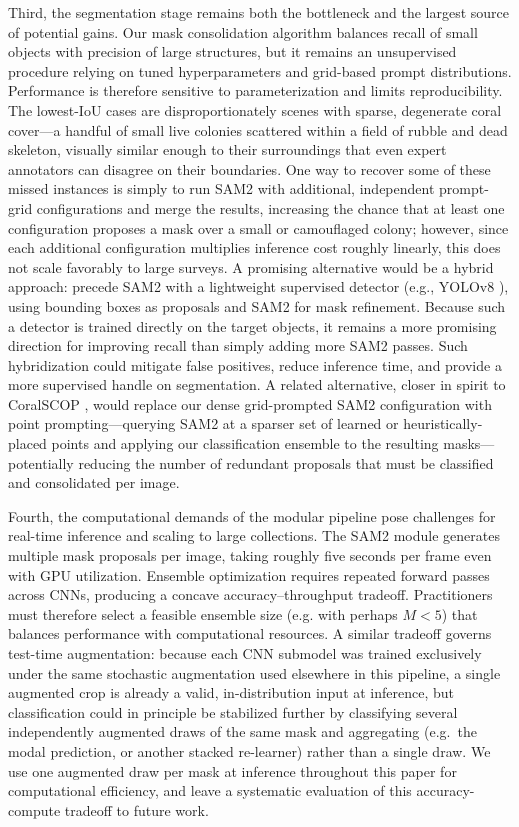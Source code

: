 \documentclass[11pt]{elsarticle}
\begin{document}
Third, the segmentation stage remains both the bottleneck and the largest source of potential gains. Our mask consolidation algorithm balances recall of small objects with precision of large structures, but it remains an unsupervised procedure relying on tuned hyperparameters and grid-based prompt distributions. Performance is therefore sensitive to parameterization and limits reproducibility. The lowest-IoU cases are disproportionately scenes with sparse, degenerate coral cover---a handful of small live colonies scattered within a field of rubble and dead skeleton, visually similar enough to their surroundings that even expert annotators can disagree on their boundaries. One way to recover some of these missed instances is simply to run SAM2 with additional, independent prompt-grid configurations and merge the results, increasing the chance that at least one configuration proposes a mask over a small or camouflaged colony; however, since each additional configuration multiplies inference cost roughly linearly, this does not scale favorably to large surveys. A promising alternative would be a hybrid approach: precede SAM2 with a lightweight supervised detector (e.g., YOLOv8 \citep{yolov8}), using bounding boxes as proposals and SAM2 for mask refinement. Because such a detector is trained directly on the target objects, it remains a more promising direction for improving recall than simply adding more SAM2 passes. Such hybridization could mitigate false positives, reduce inference time, and provide a more supervised handle on segmentation. A related alternative, closer in spirit to CoralSCOP \citep{zheng2024}, would replace our dense grid-prompted SAM2 configuration with point prompting---querying SAM2 at a sparser set of learned or heuristically-placed points and applying our classification ensemble to the resulting masks---potentially reducing the number of redundant proposals that must be classified and consolidated per image.

Fourth, the computational demands of the modular pipeline pose challenges for real-time inference and scaling to large collections. The SAM2 module generates multiple mask proposals per image, taking roughly five seconds per frame even with GPU utilization. Ensemble optimization requires repeated forward passes across CNNs, producing a concave accuracy--throughput tradeoff. Practitioners must therefore select a feasible ensemble size (e.g. with perhaps $M<5$) that balances performance with computational resources. A similar tradeoff governs test-time augmentation: because each CNN submodel was trained exclusively under the same stochastic augmentation used elsewhere in this pipeline, a single augmented crop is already a valid, in-distribution input at inference, but classification could in principle be stabilized further by classifying several independently augmented draws of the same mask and aggregating (e.g.\ the modal prediction, or another stacked re-learner) rather than a single draw. We use one augmented draw per mask at inference throughout this paper for computational efficiency, and leave a systematic evaluation of this accuracy-compute tradeoff to future work.
\end{document}
